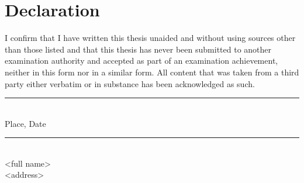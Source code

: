 \chapter*{Declaration}
\thispagestyle{empty}

\noindent
I confirm that I have written this thesis unaided and without using sources other than those listed and that this thesis has never been submitted to another examination authority and accepted as part of an examination achievement, neither in this form nor in a similar form.
All content that was taken from a third party either verbatim or in substance has been acknowledged as such.

\vspace{3cm}

\begin{minipage}[t]{0.45\textwidth}
    \rule{\textwidth}{0.5pt}\\
	Place, Date
\end{minipage}
\hfill
\begin{minipage}[t]{0.45\textwidth}
	\rule{\textwidth}{0.5pt}\\
	<full name>\\
    <address>
\end{minipage}
